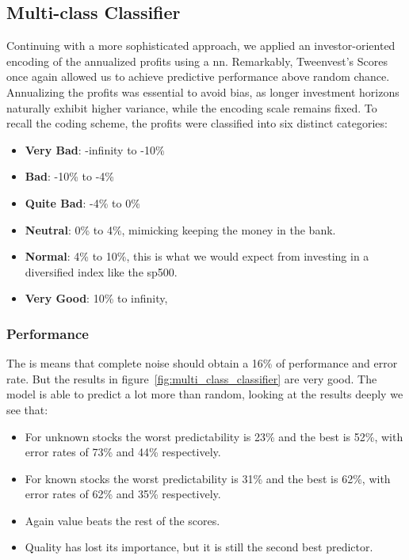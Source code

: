 \documentclass[11pt,english,a4paper,hidelinks]{book}
\begin{document}
\subsection{Multi-class Classifier}

Continuing with a more sophisticated approach, we applied an investor-oriented encoding of the annualized profits using a \acrshort{nn}. Remarkably, Tweenvest’s Scores once again allowed us to achieve predictive performance above random chance. Annualizing the profits was essential to avoid bias, as longer investment horizons naturally exhibit higher variance, while the encoding scale remains fixed. To recall the coding scheme, the profits were classified into six distinct categories:
\begin{itemize}
    \item \textbf{Very Bad}: -infinity to -10\%
    \item \textbf{Bad}: -10\% to -4\%
    \item \textbf{Quite Bad}: -4\% to 0\%
    \item \textbf{Neutral}: 0\% to 4\%, mimicking keeping the money in the bank.
    \item \textbf{Normal}: 4\% to 10\%, this is what we would expect from investing in a diversified index like the \acrshort{sp500}.
    \item \textbf{Very Good}: 10\% to infinity, 
\end{itemize}


\subsubsection{Performance}


\noindent The is means that complete noise should obtain a 16\% of performance and error rate. But the results in figure~\ref{fig:multi_class_classifier} are very good. The model is able to predict a lot more than random, looking at the results deeply we see that:
\begin{itemize}
    \item For unknown stocks the worst predictability is 23\% and the best is 52\%, with error rates of 73\% and 44\% respectively. 
    \item For known stocks the worst predictability is 31\% and the best is 62\%, with error rates of 62\% and 35\% respectively.
    \item Again value beats the rest of the scores.
    \item Quality has lost its importance, but it is still the second best predictor.
\end{itemize}
\end{document}
